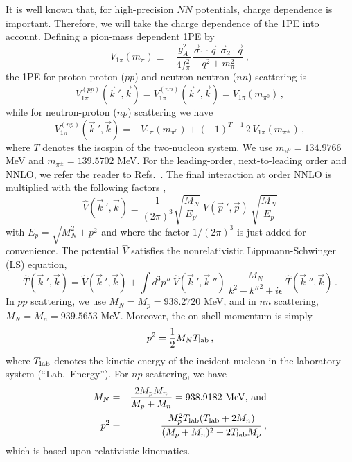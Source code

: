 It is well known that, for high-precision $NN$ potentials,
charge dependence is important.
Therefore, we will 
take the charge dependence of the 1PE into account.
Defining a pion-mass dependent 1PE by
\[
V_{1\pi} (m_\pi) \equiv - \,
\frac{g_A^2}{4f_\pi^2} \,
\frac{
\vec \sigma_1 \cdot \vec q \,\, \vec \sigma_2 \cdot \vec q}
{q^2 + m_\pi^2} 
\,,
\]
the 1PE for proton-proton ($pp$) and neutron-neutron ($nn$)
scattering is
\[
V_{1\pi}^{(pp)} ({\vec k}~', \vec k) = 
V_{1\pi}^{(nn)} ({\vec k}~', \vec k) =
V_{1\pi} (m_{\pi^0}) \,,
\]
while for neutron-proton ($np$) scattering we have
\[
V_{1\pi}^{(np)} ({\vec k}~', \vec k) 
= -V_{1\pi} (m_{\pi^0}) + (-1)^{T+1}\, 2\, V_{1\pi} (m_{\pi^\pm})
\,,
\]
where $T$ denotes the isospin of the two-nucleon system.
We use $m_{\pi^0}=134.9766$ MeV and
 $m_{\pi^\pm}=139.5702$ MeV.
For the leading-order, next-to-leading order and NNLO, we refer the reader to Refs.~\cite{machleidt2011,carlsson2014}.
The final interaction at order NNLO is multiplied with the following factors \cite{machleidt2011},
\begin{equation}
\widehat{V}({\vec k}~',{\vec k})
\equiv 
\frac{1}{(2\pi)^3}
\sqrt{\frac{M_N}{E_{p'}}}\:  
{V}({\vec p}~',{\vec p})\:
 \sqrt{\frac{M_N}{E_{p}}}
\label{eq_minrel1}
\end{equation}
with $E_p=\sqrt{M_N^2+p^2}$ and
where the factor $1/(2\pi)^3$ is just added for convenience.
The potential $\widehat{V}$ satisfies the nonrelativistic
Lippmann-Schwinger (LS) equation,
\begin{equation}
 \widehat{T}({\vec k}~',{\vec k})= \widehat{V}({\vec k}~',{\vec k})+
\int d^3p''\:
\widehat{V}({\vec k}~',{\vec k}~'')\:
\frac{M_N}
{{ k}^{2}-{k''}^{2}+i\epsilon}\:
\widehat{T}({\vec k}~'',{\vec k}) \, .
\label{eq_LS}
\end{equation}
In $pp$ scattering, we use $M_N=M_p=938.2720$ MeV,
and in $nn$ scattering, $M_N=M_n=939.5653$ MeV.
Moreover, the on-shell momentum is simply
\begin{equation}
p^2  =  \frac12 M_N T_{\rm lab} \,,
\end{equation}
where $T_{\rm lab}$ denotes 
the kinetic energy of the incident nucleon 
in the laboratory system (``Lab.\ Energy'').
For $np$ scattering, we have
\begin{eqnarray}
M_N  &=&  \frac{2M_pM_n}{M_p+M_n} = 938.9182 \mbox{ MeV, and}
\\
p^2 & = & \frac{M_p^2 T_{\rm lab} (T_{\rm lab} + 2M_n)}
               {(M_p + M_n)^2 + 2T_{\rm lab} M_p}  
\,,
\end{eqnarray}
which is based upon relativistic kinematics.

